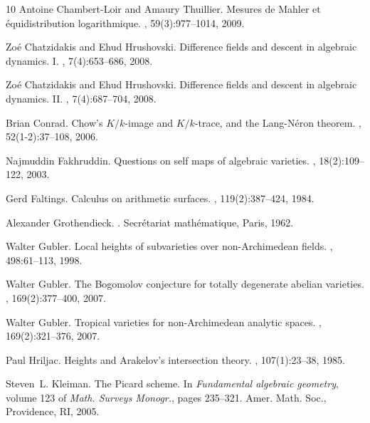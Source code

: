\documentclass[times, doublespace]{amsart}
\numberwithin{equation}{section}
\theoremstyle{plain}
\theoremstyle{definition}
\begin{document}
\begin{thebibliography}{10}
Antoine Chambert-Loir and Amaury Thuillier.
\newblock Mesures de {M}ahler et \'equidistribution logarithmique.
, 59(3):977--1014, 2009.

Zo\'{e} Chatzidakis and Ehud Hrushovski.
\newblock Difference fields and descent in algebraic dynamics. {I}.
, 7(4):653--686, 2008.

Zo\'{e} Chatzidakis and Ehud Hrushovski.
\newblock Difference fields and descent in algebraic dynamics. {II}.
, 7(4):687--704, 2008.

Brian Conrad.
\newblock Chow's {$K/k$}-image and {$K/k$}-trace, and the {L}ang-{N}\'eron
  theorem.
, 52(1-2):37--108, 2006.

Najmuddin Fakhruddin.
\newblock Questions on self maps of algebraic varieties.
, 18(2):109--122, 2003.

Gerd Faltings.
\newblock Calculus on arithmetic surfaces.
, 119(2):387--424, 1984.

Alexander Grothendieck.
.
\newblock Secr\'{e}tariat math\'{e}matique, Paris, 1962.

Walter Gubler.
\newblock Local heights of subvarieties over non-{A}rchimedean fields.
, 498:61--113, 1998.

Walter Gubler.
\newblock The {B}ogomolov conjecture for totally degenerate abelian varieties.
, 169(2):377--400, 2007.

Walter Gubler.
\newblock Tropical varieties for non-{A}rchimedean analytic spaces.
, 169(2):321--376, 2007.

Paul Hriljac.
\newblock Heights and {A}rakelov's intersection theory.
, 107(1):23--38, 1985.

Steven~L. Kleiman.
\newblock The {P}icard scheme.
\newblock In {\em Fundamental algebraic geometry}, volume 123 of {\em Math.
  Surveys Monogr.}, pages 235--321. Amer. Math. Soc., Providence, RI, 2005.


\end{thebibliography}
\end{document}
